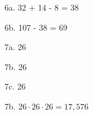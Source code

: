 {\begin{itemize}
        \item[6a.]  32 + 14 - 8 = 38
        \item[6b.]  107 - 38 = 69
        
        \item[7a.]  26
        \item[7b.]  26
        \item[7c.]  26
        \item[7b.]  $26 \cdot 26 \cdot 26 = 17,576$
    \end{itemize}
}


